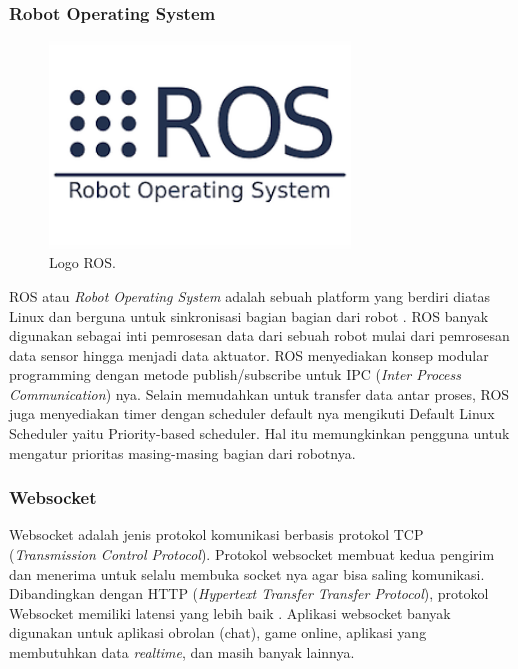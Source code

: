 \subsubsection{Robot Operating System}
\label{sec:ros}
\begin{figure}[ht]
    \centering
  
    \includegraphics[width=8cm]{gambar/ros.png}
  
    \caption{Logo ROS.}
    \label{fig:ros}
\end{figure}
ROS atau \emph{Robot Operating System} adalah sebuah platform yang berdiri 
diatas 
Linux dan berguna untuk sinkronisasi bagian bagian dari 
robot \citet{ref_ros}. ROS banyak digunakan sebagai inti 
pemrosesan data dari sebuah robot mulai dari pemrosesan data sensor 
hingga menjadi data aktuator. ROS menyediakan konsep modular programming 
dengan metode publish/subscribe untuk IPC (\emph{Inter Process Communication}) nya. Selain memudahkan untuk 
transfer data antar proses, ROS juga menyediakan timer dengan scheduler 
default nya mengikuti Default Linux Scheduler yaitu Priority-based scheduler. 
Hal itu memungkinkan pengguna untuk mengatur prioritas masing-masing bagian 
dari robotnya. 

\subsubsection{Websocket}
Websocket adalah jenis protokol komunikasi berbasis protokol TCP (\emph{Transmission Control Protocol}). 
Protokol websocket membuat kedua pengirim dan menerima untuk selalu 
membuka socket nya agar bisa saling komunikasi. 
Dibandingkan dengan HTTP (\emph{Hypertext Transfer Transfer Protocol}), 
protokol Websocket memiliki 
latensi yang lebih baik \citet{ref_websocket}. Aplikasi 
websocket banyak digunakan untuk aplikasi obrolan (chat), game online,
 aplikasi yang membutuhkan data \emph{realtime}, dan masih banyak lainnya. 
